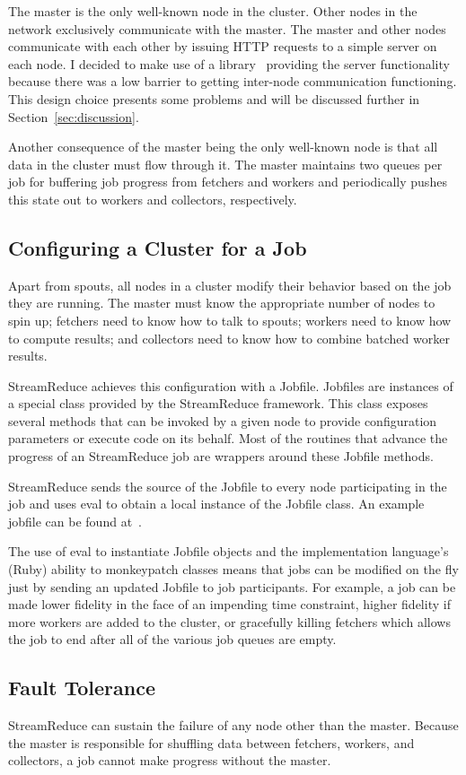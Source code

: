 \documentclass[12pt,twocolumn]{article}
\begin{document}
The master is the only well-known node in the cluster. Other nodes in the network exclusively
communicate with the master. The master and other nodes communicate with each other by issuing
HTTP requests to a simple server on each node. I decided to make use of a library~\cite{sinatrarb}
providing the server functionality because there was a low barrier to getting inter-node
communication functioning. This design choice presents some problems and will be discussed
further in Section~\ref{sec:discussion}.

Another consequence of the master being the only well-known node is that all data in the
cluster must flow through it. The master maintains two queues per job for buffering job
progress from fetchers and workers and periodically pushes this state out to workers and
collectors, respectively.
\subsection{Configuring a Cluster for a Job}
\label{sec:jobfile}
Apart from spouts, all nodes in a cluster modify their behavior based on the job they are
running. The master must know the appropriate number of nodes to spin up; fetchers need to
know how to talk to spouts; workers need to know how to compute results; and collectors need
to know how to combine batched worker results.

StreamReduce achieves this configuration with a Jobfile. Jobfiles are instances of a special class
provided by the StreamReduce framework. This class exposes several methods that can be invoked by a
given node to provide configuration parameters or execute code on its behalf. Most of the
routines that advance the progress of an StreamReduce job are wrappers around these Jobfile methods.

StreamReduce sends the source of the Jobfile to every node participating in the job and uses eval to
obtain a local instance of the Jobfile class. An example jobfile can be found at~\cite{github}.

The use of eval to instantiate Jobfile objects and the implementation language's (Ruby)
ability to monkeypatch classes means that jobs can be modified on the fly just by sending
an updated Jobfile to job participants. For example, a job can be made lower fidelity in
the face of an impending time constraint, higher fidelity if more workers are added to
the cluster, or gracefully killing fetchers which allows the job to end after all of the
various job queues are empty.
\subsection{Fault Tolerance}
StreamReduce can sustain the failure of any node other than the master. Because the master is responsible
for shuffling data between fetchers, workers, and collectors, a job cannot make progress without
the master.
\end{document}
